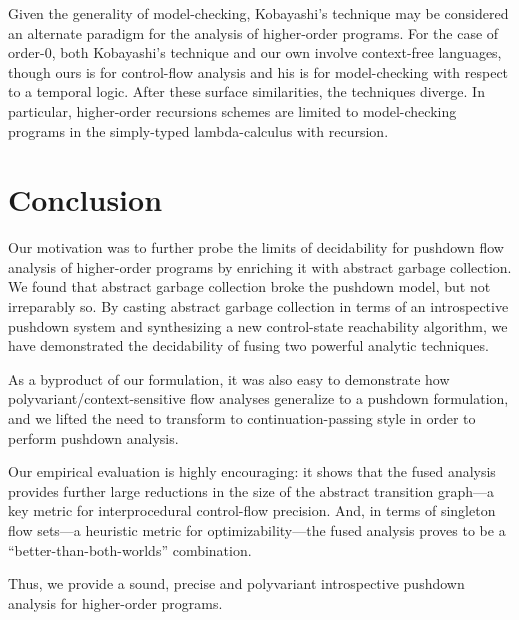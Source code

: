 Given the generality of model-checking, Kobayashi's technique may be
considered an alternate paradigm for the analysis of
higher-order programs.
For the case of order-0, both Kobayashi's technique and our own
involve context-free languages, though ours is for control-flow
analysis and his is for model-checking with respect to a temporal
logic.
After these surface similarities, the techniques diverge.
In particular, higher-order recursions schemes are limited
to model-checking programs in the simply-typed 
lambda-calculus with recursion.


















\section{Conclusion}

Our motivation was to further probe the limits of decidability
for pushdown flow analysis of higher-order programs
by enriching it with abstract garbage collection.
We found that abstract garbage collection broke
the pushdown model, but not irreparably so.
By casting abstract garbage collection in terms of
an introspective pushdown system and synthesizing
a new control-state reachability algorithm, we have 
demonstrated the decidability of fusing two
powerful analytic techniques.

As a byproduct of our formulation, it was also easy
to demonstrate how polyvariant/context-sensitive 
flow analyses generalize to a pushdown formulation,
and we lifted the need to transform to continuation-passing style
in order to perform pushdown analysis.


Our empirical evaluation is highly encouraging: it shows that the fused
analysis provides further large reductions in the size of the abstract
transition graph---a key metric for interprocedural control-flow precision.
And, in terms of singleton flow sets---a heuristic metric for optimizability---the fused 
analysis proves to be a ``better-than-both-worlds'' combination.

Thus, we provide a sound, precise and polyvariant introspective
pushdown analysis for higher-order programs.



